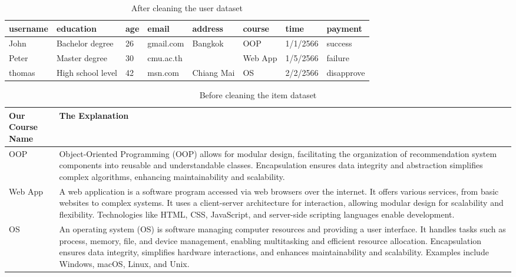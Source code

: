 \begin{table}[htbp]
\center
\small
\begin{tabular}{p{1.2cm}p{1.75cm}p{0.5cm}p{1.5cm}p{1.75cm}p{1.4cm}p{1.5cm}p{1.7cm}} %
    \toprule
    \textbf{username} & \textbf{education} & \textbf{age}   & \textbf{email} & \textbf{address}   & \textbf{course} & \textbf{time} & \textbf{payment} \\
    \midrule
    John          & Bachelor degree & 26           & gmail.com    & Bangkok  & OOP & 1/1/2566     & success  \\
    Peter         & Master degree & 30     & cmu.ac.th    &    & Web App & 1/5/2566  & failure \\
    thomas      & High school level & 42    & msn.com   & Chiang Mai & OS & 2/2/2566 & disapprove  \\
    \bottomrule
\end{tabular}
\caption{After cleaning the user dataset}
\end{table}

\begin{table}[H]
\center
\small
\begin{tabular}{p{3cm}p{10.85cm}}
    \toprule
    \textbf{Our Course Name} & \textbf{The Explanation} \\
    \midrule
    OOP &Object-Oriented Programming (OOP) allows for modular design, facilitating the organization 
    of recommendation system components into reusable and understandable classes. 
    Encapsulation ensures data integrity and abstraction simplifies complex algorithms, 
    enhancing maintainability and scalability. \\
    Web App &A web application is a software program accessed via web browsers over the internet. 
    It offers various services, from basic websites to complex systems. It uses a client-server 
    architecture for interaction, allowing modular design for scalability and flexibility. Technologies 
    like HTML, CSS, JavaScript, and server-side scripting languages enable development. \\
    OS &An operating system (OS) is software managing computer resources and providing a user interface. 
    It handles tasks such as process, memory, file, and device management, enabling multitasking and 
    efficient resource allocation. Encapsulation ensures data integrity, simplifies hardware interactions, 
    and enhances maintainability and scalability. Examples include Windows, macOS, Linux, and Unix. \\
    \bottomrule
\end{tabular}
\caption{Before cleaning the item dataset}
\end{table}

